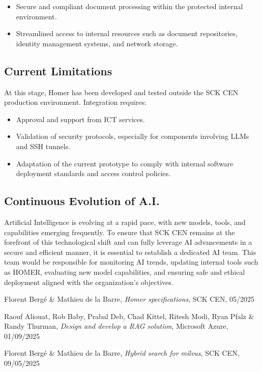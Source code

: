 \documentclass[11pt,a4paper]{report}
\begin{document}
\begin{itemize}
    \item Secure and compliant document processing within the protected internal environment.
    \item Streamlined access to internal resources such as document repositories, identity management systems, and network storage.
\end{itemize}

\subsection*{Current Limitations}

At this stage, Homer has been developed and tested outside the SCK CEN production environment. Integration requires:

\begin{itemize}
    \item Approval and support from ICT services.
    \item Validation of security protocols, especially for components involving LLMs and SSH tunnels.
    \item Adaptation of the current prototype to comply with internal software deployment standards and access control policies.
\end{itemize}


\subsection*{Continuous Evolution of A.I.} 
Artificial Intelligence is evolving at a rapid pace, with new models, tools, and capabilities emerging frequently. To ensure that SCK CEN remains at the forefront of this technological shift and can fully leverage AI advancements in a secure and efficient manner, it is essential to establish a dedicated AI team. This team would be responsible for monitoring AI trends, updating internal tools such as HOMER, evaluating new model capabilities, and ensuring safe and ethical deployment aligned with the organization's objectives.



\begin{thebibliography}{9}

Florent Bergé \& Mathieu de la Barre, 
\textit{Homer specifications}, 
SCK CEN, 05/2025

Raouf Aliouat, Rob Baby, Prabal Deb, Chad Kittel, Ritesh Modi, Ryan Pfalz \& Randy Thurman, 
\textit{Design and develop a RAG solution}, 
Microsoft Azure, 01/09/2025

Florent Bergé \& Mathieu de la Barre, 
\textit{Hybrid search for milvus}, 
SCK CEN, 09/05/2025

\end{thebibliography}
\end{document}
